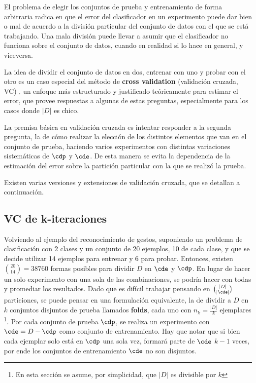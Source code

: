 El problema de elegir los conjuntos de prueba y entrenamiento de forma arbitraria radica en que el error del clasificador en un experimento puede dar bien o mal de acuerdo a la división particular del conjunto de datos con el que se está trabajando. Una mala división puede llevar a asumir que el clasificador no funciona sobre el conjunto de datos, cuando en realidad si lo hace en general, y viceversa.

La idea de dividir el conjunto de datos en dos, entrenar con uno y probar con el otro es un caso especial del método de \textbf{cross validation} (validación cruzada, VC) \cite{refaeilzadeh2009}, un enfoque más estructurado y justificado teóricamente para estimar el error, que provee respuestas a algunas de estas preguntas, especialmente para los casos donde $|D|$ es chico. 

La premisa básica en validación cruzada es intentar responder a la segunda pregunta, la de cómo realizar la elección de los distintos elementos que van en el conjunto de prueba, haciendo varios experimentos con distintas variaciones sistemáticas de $\cdp$ y $\cde$. De esta manera se evita la dependencia de la estimación del error sobre la partición particular con la que se realizó la prueba.

Existen varias versiones y extensiones de validación cruzada, que se detallan a continuación.

\subsection{VC de k-iteraciones}

Volviendo al ejemplo del reconocimiento de gestos, suponiendo un problema de clasificación con 2 clases y un conjunto de 20 ejemplos, 10 de cada clase, y que se decide utilizar 14 ejemplos para entrenar y 6 para probar. Entonces, existen $\binom{20}{14}=38760$ formas posibles para dividir $D$ en $\cde$ y $\cdp$. En lugar de hacer un solo experimento con una sola de las combinaciones, se podría hacer con todas y promediar los resultados. Dado que es difícil trabajar pensando en $\binom{|D|}{|\cde|}$ particiones, se puede pensar en una formulación equivalente, la de dividir a $D$ en $k$ conjuntos disjuntos de prueba llamados \textbf{folds}, cada uno con $n_k=\frac{|D|}{k}$ ejemplares \footnote{En esta sección se asume, por simplicidad, que $|D|$ es divisible por $k$}. Por cada conjunto de prueba $\cdp$, se realiza un experimento con $\cde=D-\cdp$ como conjunto de entrenamiento. Hay que notar que si bien cada ejemplar solo está en $\cdp$ una sola vez, formará parte de $\cde$ $k-1$ veces, por ende los conjuntos de entrenamiento $\cde$ no son disjuntos. 

